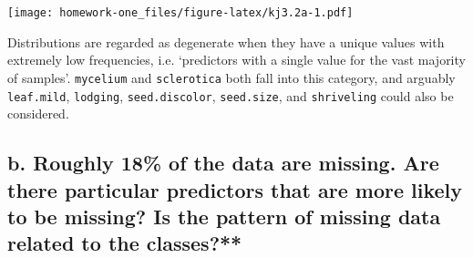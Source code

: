 \documentclass[openany]{book}
\newenvironment{Shaded}{\begin{snugshade}}{\end{snugshade}}
\newcommand{\CommentTok}[1]{\textcolor[rgb]{0.56,0.35,0.01}{\textit{#1}}}
\newcommand{\DataTypeTok}[1]{\textcolor[rgb]{0.13,0.29,0.53}{#1}}
\newcommand{\DecValTok}[1]{\textcolor[rgb]{0.00,0.00,0.81}{#1}}
\newcommand{\KeywordTok}[1]{\textcolor[rgb]{0.13,0.29,0.53}{\textbf{#1}}}
\newcommand{\NormalTok}[1]{#1}
\newcommand{\OperatorTok}[1]{\textcolor[rgb]{0.81,0.36,0.00}{\textbf{#1}}}
\newcommand{\StringTok}[1]{\textcolor[rgb]{0.31,0.60,0.02}{#1}}
\begin{document}
\begin{Shaded}
\end{Shaded}

\texttt{[image: homework-one\_files/figure-latex/kj3.2a-1.pdf]}

Distributions are regarded as degenerate when they have a unique values with extremely low frequencies, i.e. `predictors with a single value for the vast majority of samples'. \texttt{mycelium} and \texttt{sclerotica} both fall into this category, and arguably \texttt{leaf.mild}, \texttt{lodging}, \texttt{seed.discolor}, \texttt{seed.size}, and \texttt{shriveling} could also be considered.

\hypertarget{b.-roughly-18-of-the-data-are-missing.-are-there-particular-predictors-that-are-more-likely-to-be-missing-is-the-pattern-of-missing-data-related-to-the-classes}{%
\subsection{b. Roughly 18\% of the data are missing. Are there particular predictors that are more likely to be missing? Is the pattern of missing data related to the classes?**}\label{b.-roughly-18-of-the-data-are-missing.-are-there-particular-predictors-that-are-more-likely-to-be-missing-is-the-pattern-of-missing-data-related-to-the-classes}}
\end{document}
